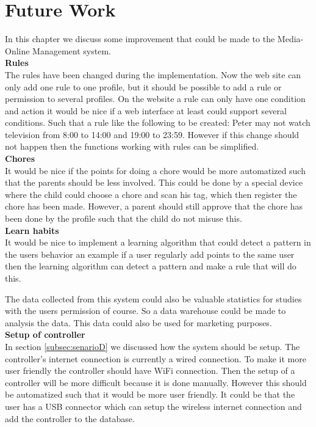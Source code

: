 \chapter{Future Work}
In this chapter we discuss some improvement that could be made to the Media-Online Management system.\\

\textbf{Rules}\\
The rules have been changed during the implementation. Now the web site can only add one rule to one profile, but it should be possible to add a rule or permission to several profiles. On the website a rule can only have one condition and action it would be nice if a web interface at least could support several conditions. Such that a rule like the following to be created: Peter may not watch television from 8:00 to 14:00 and 19:00 to 23:59. However if this change should not happen then the functions working with rules can be simplified. \\

\textbf{Chores}\\
It would be nice if the points for doing a chore would be more automatized such that the parents should be less involved. This could be done by a special device where the child could choose a chore and scan his tag, which then register the chore has been made. However, a parent should still approve that the chore has been done by the profile such that the child do not misuse this.\\

\textbf{Learn habits}\\
It would be nice to implement a learning algorithm that could detect a pattern in the users behavior an example if a user regularly add points to the same user then the learning algorithm can detect a pattern and make a rule that will do this. 

The data collected from this system could also be valuable statistics for studies with the users permission of course. So a data warehouse could be made to analysis the data. This data could also be used for marketing purposes. \\

\textbf{Setup of controller}\\
In section \vref{subsec:senarioD} we discussed how the system should be setup. The controller's internet connection is currently a wired connection. To make it more user friendly the controller should have WiFi connection. Then the setup of a controller will be more difficult because it is done manually. However this should be automatized such that it would be more user friendly. It could be that the user has a USB connector which can setup the wireless internet connection and add the controller to the database. 

